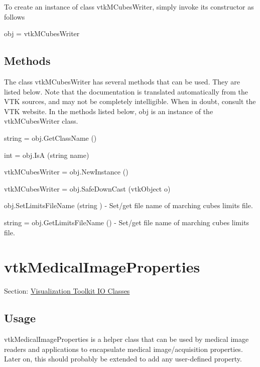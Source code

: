 To create an instance of class vtk\-M\-Cubes\-Writer, simply invoke its constructor as follows \begin{DoxyVerb}  obj = vtkMCubesWriter
\end{DoxyVerb}
 \hypertarget{vtkwidgets_vtkxyplotwidget_Methods}{}\subsection{Methods}\label{vtkwidgets_vtkxyplotwidget_Methods}
The class vtk\-M\-Cubes\-Writer has several methods that can be used. They are listed below. Note that the documentation is translated automatically from the V\-T\-K sources, and may not be completely intelligible. When in doubt, consult the V\-T\-K website. In the methods listed below, {\ttfamily obj} is an instance of the vtk\-M\-Cubes\-Writer class. 
\begin{DoxyItemize}
\item {\ttfamily string = obj.\-Get\-Class\-Name ()}  
\item {\ttfamily int = obj.\-Is\-A (string name)}  
\item {\ttfamily vtk\-M\-Cubes\-Writer = obj.\-New\-Instance ()}  
\item {\ttfamily vtk\-M\-Cubes\-Writer = obj.\-Safe\-Down\-Cast (vtk\-Object o)}  
\item {\ttfamily obj.\-Set\-Limits\-File\-Name (string )} -\/ Set/get file name of marching cubes limits file.  
\item {\ttfamily string = obj.\-Get\-Limits\-File\-Name ()} -\/ Set/get file name of marching cubes limits file.  
\end{DoxyItemize}\hypertarget{vtkio_vtkmedicalimageproperties}{}\section{vtk\-Medical\-Image\-Properties}\label{vtkio_vtkmedicalimageproperties}
Section\-: \hyperlink{sec_vtkio}{Visualization Toolkit I\-O Classes} \hypertarget{vtkwidgets_vtkxyplotwidget_Usage}{}\subsection{Usage}\label{vtkwidgets_vtkxyplotwidget_Usage}
vtk\-Medical\-Image\-Properties is a helper class that can be used by medical image readers and applications to encapsulate medical image/acquisition properties. Later on, this should probably be extended to add any user-\/defined property.

